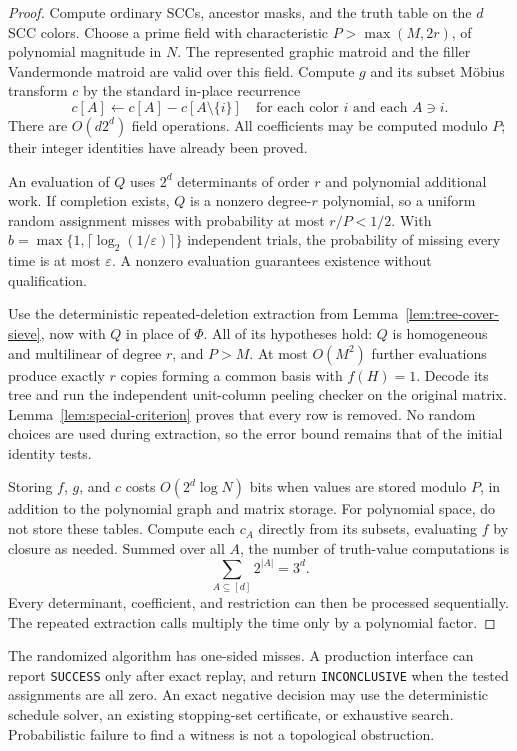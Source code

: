 \begin{proof}
Compute ordinary SCCs, ancestor masks, and the truth table on the $d$
SCC colors.  Choose a prime field with characteristic
$P>\max(M,2r)$, of polynomial magnitude in $N$.  The represented graphic
matroid and the filler Vandermonde matroid are valid over this field.
Compute $g$ and its subset M\"obius transform $c$ by the standard in-place
recurrence
\[
     c[A]\leftarrow c[A]-c[A\setminus\{i\}]
       \quad\text{for each color }i\text{ and each }A\ni i.
\]
There are $O(d2^d)$ field operations.  All coefficients may be computed
modulo $P$; their integer identities have already been proved.

An evaluation of $Q$ uses $2^d$ determinants of order $r$ and polynomial
additional work.  If completion exists, $Q$ is a nonzero degree-$r$
polynomial, so a uniform random assignment misses with probability at
most $r/P<1/2$.  With
$b=\max\{1,\lceil\log_2(1/\varepsilon)\rceil\}$ independent trials,
the probability of missing every time is at most $\varepsilon$.
A nonzero evaluation guarantees existence without qualification.

Use the deterministic repeated-deletion extraction from
Lemma~\ref{lem:tree-cover-sieve}, now with $Q$ in place of $\Phi$.
All of its hypotheses hold: $Q$ is homogeneous and multilinear of degree
$r$, and $P>M$.  At most $O(M^2)$ further evaluations produce exactly
$r$ copies forming a common basis with $f(H)=1$.  Decode its tree and
run the independent unit-column peeling checker on the original matrix.
Lemma~\ref{lem:special-criterion} proves that every row is removed.
No random choices are used during extraction, so the error bound remains
that of the initial identity tests.

Storing $f$, $g$, and $c$ costs $O(2^d\log N)$ bits when values are stored
modulo $P$, in addition to the polynomial graph and matrix storage.
For polynomial space, do not store these tables.  Compute each $c_A$
directly from its subsets, evaluating $f$ by closure as needed.  Summed
over all $A$, the number of truth-value computations is
\[
                          \sum_{A\subseteq[d]}2^{|A|}=3^d.
\]
Every determinant, coefficient, and restriction can then be processed
sequentially.  The repeated extraction calls multiply the time only by
a polynomial factor.
\end{proof}

The randomized algorithm has one-sided misses.  A production interface
can report \texttt{SUCCESS} only after exact replay, and return
\texttt{INCONCLUSIVE} when the tested assignments are all zero.  An exact
negative decision may use the deterministic schedule solver, an existing
stopping-set certificate, or exhaustive search.  Probabilistic failure
to find a witness is not a topological obstruction.

